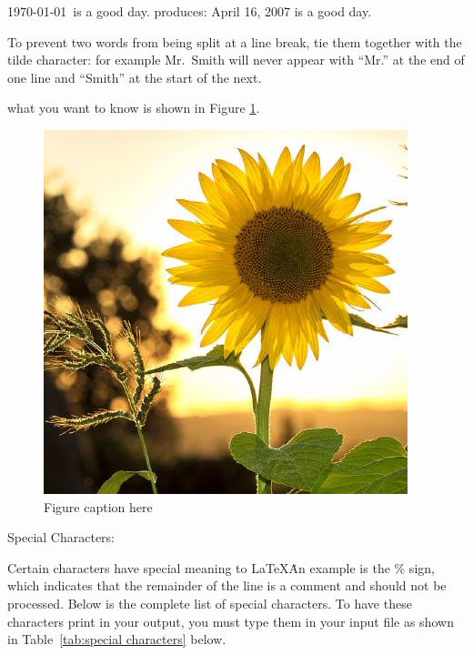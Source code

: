 \documentclass[a4paper,11pt,UTF8,openright]{book}
\begin{document}
\today\ is a good day. produces: April 16, 2007 is a good day.

To prevent two words from being split at a line break, tie them together with the tilde
character: for example Mr.~Smith will never appear with “Mr.” at the end of one line
and “Smith” at the start of the next.


what you want to know is shown in Figure \ref{fig:29571453.jpg}.

\begin{figure}[!htbp]
	\centering
	\includegraphics[width=\textwidth]{29571453.jpg}
	\caption{Figure caption here}
	\label{fig:29571453.jpg}
\end{figure}

Special Characters:

Certain characters have special meaning to \LaTeX\. An example is the \% sign, which indicates that the remainder of the line is a comment and should not be processed. Below is the complete list of special characters. To have these characters print in your output, you must type them in your input file as shown in Table~\ref{tab:special characters} below.
\end{document}
